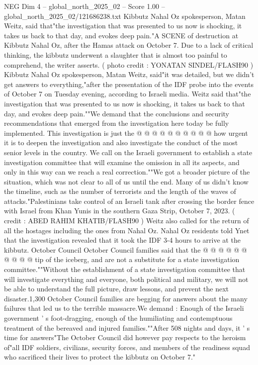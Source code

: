 \begin{textsample}{NEG Dim 4 – global\_north\_2025\_02 – Score 1.00 – global\_north\_2025\_02/121686238.txt}  \label{ex:f4_neg_407}
Kibbutz Nahal Oz spokesperson, Matan Weitz, said that"the investigation that was presented to us now is shocking, it takes us back to that day, and evokes deep pain."A SCENE of destruction at Kibbutz Nahal Oz, after the Hamas attack on October 7.
Due to a lack of critical thinking, the kibbutz underwent a slaughter that is almost too painful to comprehend, the writer asserts. ( photo credit : YONATAN SINDEL/FLASH90 ) Kibbutz Nahal Oz spokesperson, Matan Weitz, said"it was detailed, but we didn't get answers to everything,"after the presentation of the IDF probe into the events of October 7 on Tuesday evening, according to Israeli media.
Weitz said that"the investigation that was presented to us now is shocking, it takes us back to that day, and evokes deep pain.""We demand that the conclusions and security recommendations that emerged from the investigation here today be fully implemented.
This investigation is just the @ @ @ @ @ @ @ @ @ @ how urgent it is to deepen the investigation and also investigate the conduct of the most senior levels in the country.
We call on the Israeli government to establish a state investigation committee that will examine the omission in all its aspects, and only in this way can we reach a real correction.""We got a broader picture of the situation, which was not clear to all of us until the end.
Many of us didn't know the timeline, such as the number of terrorists and the length of the waves of attacks."Palestinians take control of an Israeli tank after crossing the border fence with Israel from Khan Yunis in the southern Gaza Strip, October 7, 2023. ( credit : ABED RAHIM KHATIB/FLASH90 ) Weitz also called for the return of all the hostages including the ones from Nahal Oz.
Nahal Oz residents told Ynet that the investigation revealed that it took the IDF 3-4 hours to arrive at the kibbutz.
October Council October Council families said that the @ @ @ @ @ @ @ @ @ @ tip of the iceberg, and are not a substitute for a state investigation committee.""Without the establishment of a state investigation committee that will investigate everything and everyone, both political and military, we will not be able to understand the full picture, draw lessons, and prevent the next disaster.1,300 October Council families are begging for answers about the many failures that led us to the terrible massacre.We demand : Enough of the Israeli government ' s foot-dragging, enough of the humiliating and contemptuous treatment of the bereaved and injured families.""After 508 nights and days, it ' s time for answers"The October Council did however pay respects to the heroism of"all IDF soldiers, civilians, security forces, and members of the readiness squad who sacrificed their lives to protect the kibbutz on October 7."

\end{textsample}
